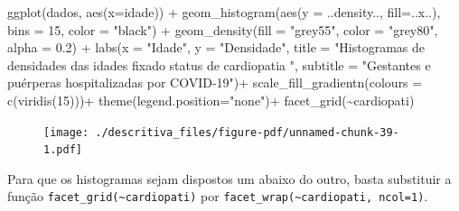\documentclass[
  letterpaper,
  DIV=11,
  numbers=noendperiod]{scrreprt}
\newenvironment{Shaded}{\begin{snugshade}}{\end{snugshade}}
\newcommand{\AttributeTok}[1]{\textcolor[rgb]{0.40,0.45,0.13}{#1}}
\newcommand{\DecValTok}[1]{\textcolor[rgb]{0.68,0.00,0.00}{#1}}
\newcommand{\FloatTok}[1]{\textcolor[rgb]{0.68,0.00,0.00}{#1}}
\newcommand{\FunctionTok}[1]{\textcolor[rgb]{0.28,0.35,0.67}{#1}}
\newcommand{\NormalTok}[1]{\textcolor[rgb]{0.00,0.23,0.31}{#1}}
\newcommand{\SpecialCharTok}[1]{\textcolor[rgb]{0.37,0.37,0.37}{#1}}
\newcommand{\StringTok}[1]{\textcolor[rgb]{0.13,0.47,0.30}{#1}}
\begin{document}
\begin{Shaded}
\begin{Highlighting}[]
\FunctionTok{ggplot}\NormalTok{(dados, }\FunctionTok{aes}\NormalTok{(}\AttributeTok{x=}\NormalTok{idade))  }\SpecialCharTok{+} 
  \FunctionTok{geom\_histogram}\NormalTok{(}\FunctionTok{aes}\NormalTok{(}\AttributeTok{y =}\NormalTok{ ..density.., }\AttributeTok{fill=}\NormalTok{..x..), }\AttributeTok{bins =} \DecValTok{15}\NormalTok{, }\AttributeTok{color =} \StringTok{"black"}\NormalTok{) }\SpecialCharTok{+}
  \FunctionTok{geom\_density}\NormalTok{(}\AttributeTok{fill =} \StringTok{"grey55"}\NormalTok{, }\AttributeTok{color =} \StringTok{"grey80"}\NormalTok{, }\AttributeTok{alpha =} \FloatTok{0.2}\NormalTok{) }\SpecialCharTok{+}
  \FunctionTok{labs}\NormalTok{(}\AttributeTok{x =} \StringTok{"Idade"}\NormalTok{, }\AttributeTok{y =} \StringTok{"Densidade"}\NormalTok{, }\AttributeTok{title =} \StringTok{"Histogramas de densidades das idades fixado status de cardiopatia "}\NormalTok{, }\AttributeTok{subtitle =} \StringTok{"Gestantes e puérperas hospitalizadas por COVID{-}19"}\NormalTok{)}\SpecialCharTok{+}
  \FunctionTok{scale\_fill\_gradientn}\NormalTok{(}\AttributeTok{colours =} \FunctionTok{c}\NormalTok{(}\FunctionTok{viridis}\NormalTok{(}\DecValTok{15}\NormalTok{)))}\SpecialCharTok{+}
  \FunctionTok{theme}\NormalTok{(}\AttributeTok{legend.position=}\StringTok{"none"}\NormalTok{)}\SpecialCharTok{+}
  \FunctionTok{facet\_grid}\NormalTok{(}\SpecialCharTok{\textasciitilde{}}\NormalTok{cardiopati)}
\end{Highlighting}
\end{Shaded}

\begin{figure}[H]

{\centering \texttt{[image: ./descritiva\_files/figure-pdf/unnamed-chunk-39-1.pdf]}

}

\end{figure}

Para que os histogramas sejam dispostos um abaixo do outro, basta
substituir a função \texttt{facet\_grid(\textasciitilde{}cardiopati)}
por \texttt{facet\_wrap(\textasciitilde{}cardiopati,\ ncol=1)}.
\end{document}
